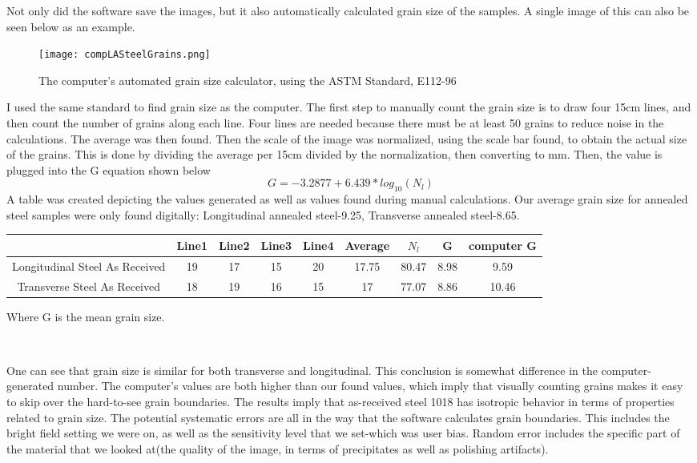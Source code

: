 \documentclass{article}
\begin{document}
Not only did the software save the images, but it also automatically calculated grain size of the samples. A single image of this can also be seen below as an example.

\begin{figure}[h]
	\centering
	\texttt{[image: compLASteelGrains.png]}
	\caption{The computer's automated grain size calculator, using the ASTM Standard, E112-96}
\end{figure}

I used the same standard to find grain size as the computer. The first step to manually count the grain size is to draw four 15cm lines, and then count the number of grains along each line. Four lines are needed because there must be at least 50 grains to reduce noise in the calculations. The average was then found. Then the scale of the image was normalized, using the scale bar found, to obtain the actual size of the grains. This is done by dividing the average per 15cm divided by the normalization, then converting to mm. Then, the value is plugged into the G equation shown below
$$G = -3.2877+6.439*log_{10}(N_l)$$
A table was created depicting the values generated as well as values found during manual calculations. Our average grain size for annealed steel samples were only found digitally: Longitudinal annealed steel-9.25, Transverse annealed steel-8.65.


\centering
\begin{tabular}{|| c | c | c | c | c | c | c | c | c ||}
 \hline
 \ & Line1 & Line2 & Line3 & Line4 & Average & $N_l$ & G & computer G\\
 \hline
 \hline
 Longitudinal Steel As Received & 19 & 17 & 15 & 20 & 17.75 & 80.47 & 8.98 & 9.59\\
 \hline
 Transverse Steel As Received & 18 & 19 & 16 & 15 & 17 & 77.07 & 8.86 & 10.46\\
 \hline
\end{tabular}
\raggedright

Where G is the mean grain size.

\ 

One can see that grain size is similar for both transverse and longitudinal. This conclusion is somewhat difference in the computer-generated number. The computer's values are both higher than our found values, which imply that visually counting grains makes it easy to skip over the hard-to-see grain boundaries. The results imply that as-received steel 1018 has isotropic behavior in terms of properties related to grain size. The potential systematic errors are all in the way that the software calculates grain boundaries. This includes the bright field setting we were on, as well as the sensitivity level that we set-which was user bias. Random error includes the specific part of the material that we looked at(the quality of the image, in terms of precipitates as well as polishing artifacts).
\end{document}
